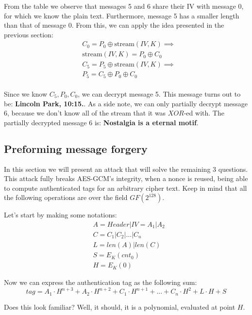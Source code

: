 \documentclass[11pt]{llncs}
\begin{document}
From the table we observe that messages 5 and 6 share their IV with message 0, for which we know the plain text. Furthermore, message 5 has a smaller length than that of message 0. From this,
we can apply the idea presented in the previous section:
\[\begin{aligned}
& C_0 = P_0 \oplus \text{stream}(IV, K) \implies\\
& \text{stream}(IV, K) = P_0 \oplus C_0 \\
& C_5 = P_5 \oplus \text{stream}(IV, K) \implies \\
& P_5 = C_5 \oplus P_0 \oplus C_0\\
\end{aligned}
\]

Since we know $C_5, P_0, C_0$, we can decrypt message 5. This message turns out to be: \textbf{Lincoln Park, 10:15.}. As a side note, we can only partially decrypt message 6, because we don't know all of the stream that it was $XOR$-ed with. The partially decrypted message 6 is: \textbf{Nostalgia is a eternal motif}.

\subsection{Preforming message forgery}
In this section we will present an attack that will solve the remaining $3$ questions. This attack fully breaks AES-GCM's integrity, when a nonce is reused, being able to compute authenticated tags for an arbitrary cipher text. Keep in mind that all the following operations are over the field $GF(2^{128})$.

Let's start by making some notations:
\[\begin{aligned}
& A = Header | IV = A_1 | A_2 \\
& C = C_1 | C_2 | \dots | C_n \\
& L = len(A) | len(C) \\
& S = E_K(cnt_0) \\
& H = E_K(0)
\end{aligned}
\]

Now we can express the authentication tag as the following sum:
\[tag = A_1 \cdot H^{n+3} + A_2 \cdot H^{n+2} + C_1 \cdot H^{n+1} + \dots + C_n \cdot H^2 + L \cdot H + S\]

Does this look familiar? Well, it should, it is a polynomial, evaluated at point $H$.
\end{document}
